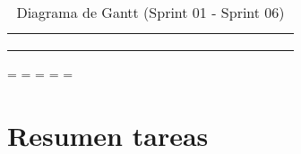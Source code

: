\begin{longtable}[c]{llclllllllllllllllll}
        \multicolumn{4}{|l|}{}                                                                                                                                                                                                                                                                                                                                                             & \multicolumn{15}{l|}{}                                                                                                                                                                                                                                                                                                                                                                                                                                                                                                                    &  \\ \cline{1-19}
                                                                                                                                &                                                                                & \multicolumn{1}{l}{}                                                             &                                                                                      &                                 &                                 &                                 &                                 &                                 &                                 &                                 &                                 &                                 &                                 &                                 &                                 &                                 &                                 &                                               &  \\ \hline
        \caption{Diagrama de Gantt (Sprint 01 - Sprint 06)}
        \label{tab:Diagrama_gantt}\\
    \end{longtable}
\endgroup
\newpage
\paperwidth=\pdfpageheight
\paperheight=\pdfpagewidth
\pdfpageheight=\paperheight
\pdfpagewidth=\paperwidth
\headwidth=\textwidth

\section{Resumen tareas}
\label{sec:tareas}

